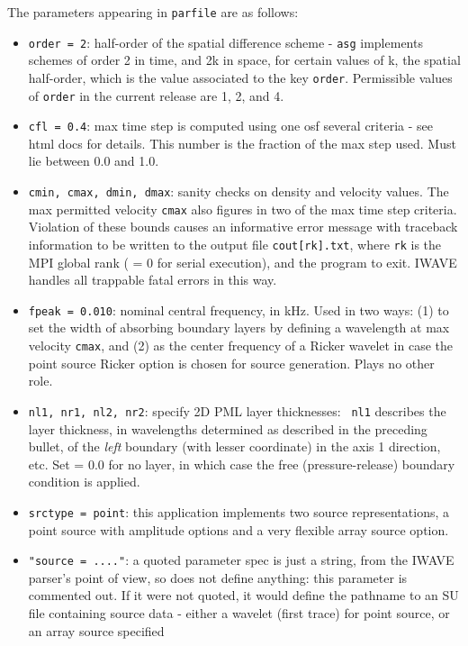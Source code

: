 The parameters appearing in {\tt parfile} are as follows:

\begin{itemize}
\item {\tt order = 2}: half-order of the spatial difference scheme -
  {\tt asg} implements schemes of order 2 in time, and 2k in space,
  for certain values of k, the spatial half-order, which is the value
  associated to the key {\tt order}. Permissible values
  of {\tt order} in the current release are 1, 2, and 4.
\item {\tt cfl = 0.4}: max time step is computed using one osf several
  criteria - see html docs for details. This number is the fraction of
  the max step used. Must lie between 0.0 and 1.0.
\item{\tt cmin, cmax, dmin, dmax}: sanity checks on density and
  velocity values. The max permitted velocity {\tt cmax} also figures
  in two of the max time step criteria. Violation of these bounds
  causes an informative error message with traceback information to be
  written to the output file {\tt cout[rk].txt}, where {\tt rk} is the
  MPI global rank ( = 0 for serial execution), and the program to
  exit. IWAVE handles all trappable fatal errors in this way.
\item {\tt fpeak = 0.010}: nominal central frequency, in kHz. Used in
  two ways: (1) to set the width of absorbing boundary layers by
  defining a wavelength at max velocity {\tt cmax}, and (2) as the
  center frequency of a Ricker wavelet in case the point source Ricker
  option is chosen for source generation. Plays no other role.
\item {\tt nl1, nr1, nl2, nr2}: specify 2D PML layer thicknesses: {\tt
    nl1} describes the layer thickness, in wavelengths determined as
  described in the preceding bullet, of the {\em left} boundary (with
  lesser coordinate) in the axis 1 direction, etc. Set = 0.0 for no
  layer, in which case the free (pressure-release) boundary condition
  is applied.
\item {\tt srctype = point}: this application implements two source
  representations, a point source with amplitude options and a very flexible array
  source option.
\item{\tt "source  = ...."}: a quoted parameter spec is just a
  string, from the IWAVE parser's point of view, so does not define
  anything: this parameter is commented out. If it were not quoted, it
  would define the pathname to an SU file containing source data -
  either a  wavelet (first trace) for point source, or an array source specified

\end{itemize}

